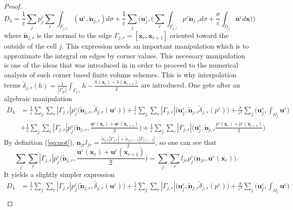 \documentclass[a4paper,french,english,10pt]{article}
\newcommand\ljr{l_{jr}}
\newcommand\njr{\mathbf{n}_{jr}}
\newcommand\tnjr{\mathbf{\tilde{n}}_{j,r}}
\newcommand\uu{\mathbf{u}}
\newcommand\eps{\varepsilon}
\newcommand\x{\mathbf{x}}
\begin{document}
\begin{proof}
\begin{equation*}
D_4= \frac{1}{\eps}\sum_j p_j^{\eps} \sum_r \int_{\Gamma_{j,r}}
(\uu^{\eps},\tnjr)d\sigma + \frac{1}{\eps}\sum_j
\bigg( \textbf{u}_j^{\eps} , \bigg( \sum_r \int_{\Gamma_{j,r}} p^{\eps}
\tnjr d\sigma
+\frac{\sigma}{\eps}\int_{\Omega_j}\uu^{\eps} d\x\bigg) \bigg)
\end{equation*}
where $\tnjr$ is the normal to the edge
$\Gamma_{j,r}=[\x_{r},\x_{r+1}]$ oriented toward the outside of the cell $j$. 
This expression needs an important manipulation which
is to approximate the integral on edges by corner values.
This necessary manipulation is one of the ideas that was introduced
in \cite{Mazeran} in order to proceed to the numerical
analysis of such corner based finite volume schemes.
This is why  interpolation terms  $\tilde{\delta}_{j,r}(h)= 
\frac1{|\Gamma_{jr}|}\int_{\Gamma_{j,r}} h
- \frac{h(\textbf{x}_{r})+h(\textbf{x}_{r+1})}{2}$ are introduced.
One gets after an algebraic manipulation 
\begin{equation*}
\begin{aligned}
D_4 &= \frac{1}{\eps}\sum_j \sum_r |\Gamma_{j,r}|   p_j^{\eps} \bigg( \tnjr
,\tilde{\delta}_{j,r}(\uu^{\eps}) \bigg) +\frac{1}{\eps}\sum_j \sum_r
|\Gamma_{j,r}| 
\bigg( \textbf{u}_j^{\eps} ,
\tnjr\tilde{\delta}_{j,r}(p^{\eps})\bigg) +
\frac{\sigma}{\eps^2}\sum_j\bigg(  \textbf{u}_j^{\eps} ,
\int_{\Omega_j}\uu^{\eps} \bigg)\\
&+ \frac{1}{\eps}\sum_j \sum_r  |\Gamma_{j,r}| p_j^{\eps} \bigg(
\tnjr ,\frac{\uu^{\eps}(\textbf{x}_{r})+\uu^{\eps}(\textbf{x}_{r+1})}{2}
\bigg) + \frac{1}{\eps}\sum_j \sum_r |\Gamma_{j,r}| \bigg( \textbf{u}_j^{\eps} ,
\tnjr
\frac{p^{\eps}(\textbf{x}_{r})+p^{\eps}(\textbf{x}_{r+1})}{2}\bigg) 
\end{aligned}
\end{equation*}
By definition (\ref{eq:not}),
$\njr\ljr=\frac{\tilde{n}_{j,r}|\Gamma_{j,r}|+\tilde{n}_{j,r-1}|\Gamma_{j,r-1}|}
{2}$, so one can see that 
$$
\sum_j \sum_r |\Gamma_{j,r}|  p_j^{\eps} \bigg(
\tnjr ,\frac{\uu^{\eps}(\textbf{x}_{r})+\uu^{\eps}(\textbf{x}_{r+1})}{2}
\bigg)= \sum_j \sum_r  l_{jr} p_j^{\eps} \big( \njr ,\uu^{\eps}(\textbf{x}_{r}) \big).
$$ 
It yields a slightly simpler expression
$$
\begin{aligned}
D_4 &= \frac{1}{\eps}\sum_j \sum_r |\Gamma_{j,r}|   p_j^{\eps} \bigg( \tnjr
,\tilde{\delta}_{j,r}(\uu^{\eps}) \bigg) +\frac{1}{\eps}\sum_j \sum_r
|\Gamma_{j,r}| 
\bigg( \textbf{u}_j^{\eps} ,
\tnjr\tilde{\delta}_{j,r}(p^{\eps})\bigg) +
\frac{\sigma}{\eps^2}\sum_j\bigg(  \textbf{u}_j^{\eps} ,
\int_{\Omega_j}\uu^{\eps} \bigg)\\

\end{aligned}$$
\end{proof}
\end{document}
